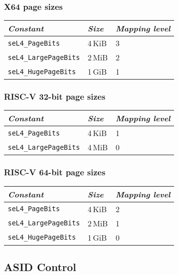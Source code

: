 \subsubsection{X64 page sizes}

\begin{tabularx}{\textwidth}{Xll} \toprule
    \emph{Constant}             & \emph{Size} & \emph{Mapping level} \\ \midrule
    \texttt{seL4\_PageBits}      & 4\,KiB      & 3                   \\
    \texttt{seL4\_LargePageBits} & 2\,MiB      & 2                   \\
    \texttt{seL4\_HugePageBits}  & 1\,GiB      & 1                   \\
    \bottomrule
\end{tabularx}

\subsubsection{RISC-V 32-bit page sizes}

\begin{tabularx}{\textwidth}{Xll} \toprule
    \emph{Constant}             & \emph{Size} & \emph{Mapping level} \\ \midrule
    \texttt{seL4\_PageBits}      & 4\,KiB      & 1                   \\
    \texttt{seL4\_LargePageBits} & 4\,MiB      & 0                   \\
    \bottomrule
\end{tabularx}

\subsubsection{RISC-V 64-bit page sizes}

\begin{tabularx}{\textwidth}{Xll} \toprule
    \emph{Constant}             & \emph{Size} & \emph{Mapping level} \\ \midrule
    \texttt{seL4\_PageBits}      & 4\,KiB      & 2                   \\
    \texttt{seL4\_LargePageBits} & 2\,MiB      & 1                   \\
    \texttt{seL4\_HugePageBits}  & 1\,GiB      & 0                   \\
    \bottomrule
\end{tabularx}

\subsection{ASID Control}

